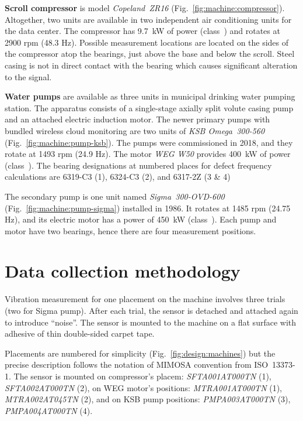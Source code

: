 \textbf{Scroll compressor} is model \emph{Copeland~ZR16} (Fig.~\ref{fig:machine:compressor}). Altogether, two units are available in two independent air conditioning units for the data center. The compressor has 9.7~kW of power (class~) and rotates at 2900 rpm (48.3 Hz). Possible measurement locations are located on the sides of the compressor atop the bearings, just above the base and below the scroll. Steel casing is not in direct contact with the bearing which causes significant alteration to the signal.

\textbf{Water pumps} are available as three units in municipal drinking water pumping station. The apparatus consists of a single-stage axially split volute casing pump and an attached electric induction motor. The newer primary pumps with bundled wireless cloud monitoring are two units of \emph{KSB Omega~300-560} (Fig.~\ref{fig:machine:pump-ksb}). The pumps were commissioned in 2018, and they rotate at 1493 rpm (24.9 Hz). The motor \emph{WEG W50} provides 400~kW of power (class~). The bearing designations at numbered places for defect frequency  calculations are 6319-C3 (1), 6324-C3 (2), and 6317-2Z (3 \& 4)

The secondary pump is one unit named \emph{Sigma~300-OVD-600} (Fig.~\ref{fig:machine:pump-sigma}) installed in 1986. It rotates at 1485 rpm (24.75 Hz), and its electric motor has a power of 450~kW (class~). Each pump and motor have two bearings, hence there are four measurement positions.

\section{Data collection methodology}
Vibration measurement for one placement on the machine involves three trials (two for Sigma pump). After each trial, the sensor is detached and attached again to introduce ``noise''. The sensor is mounted to the machine on a flat surface with adhesive of thin double-sided carpet tape.

Placements are numbered for simplicity (Fig.~\ref{fig:design:machines}) but the precise description follows the notation of MIMOSA convention from ISO~13373-1. The sensor is mounted on compressor's placem: \emph{SFTA001AT000TN} (1), \emph{SFTA002AT000TN} (2), on WEG motor's positions: \emph{MTRA001AT000TN} (1), \emph{MTRA002AT045TN} (2), and on KSB pump positions: \emph{PMPA003AT000TN} (3), \emph{PMPA004AT000TN} (4).

